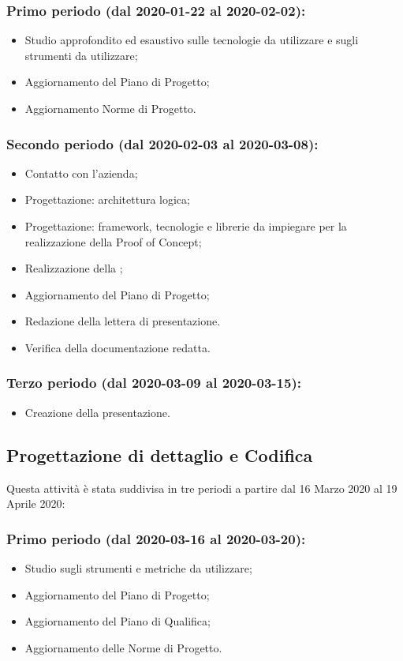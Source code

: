 		\subsubsection{Primo periodo (dal 2020-01-22 al 2020-02-02):}
			\begin{itemize}
			 	\item Studio approfondito ed esaustivo sulle tecnologie da utilizzare e sugli strumenti da utilizzare;
			 	\item Aggiornamento del Piano di Progetto;
			 	\item Aggiornamento Norme di Progetto.
			\end{itemize} 	
		
		\subsubsection{Secondo periodo (dal 2020-02-03 al 2020-03-08):}
			\begin{itemize}
				\item Contatto con l'azienda;
				\item Progettazione: architettura logica;
				\item Progettazione: framework, tecnologie e librerie da impiegare per la realizzazione della Proof of Concept;
				\item Realizzazione della ;
				\item Aggiornamento del Piano di Progetto;
				\item Redazione della lettera di presentazione.
				\item Verifica della documentazione redatta.
			\end{itemize}

		\subsubsection{Terzo periodo (dal 2020-03-09 al 2020-03-15):}
			\begin{itemize}
				\item Creazione della presentazione.
			\end{itemize}

	\subsection{Progettazione di dettaglio e Codifica}
	Questa attività è stata suddivisa in tre periodi a partire dal 16 Marzo 2020 al 19 Aprile 2020:


		\subsubsection{Primo periodo (dal 2020-03-16 al 2020-03-20):}
			\begin{itemize}
				\item Studio sugli strumenti e metriche da utilizzare;
			 	\item Aggiornamento del Piano di Progetto;
			 	\item Aggiornamento del Piano di Qualifica;
			 	\item Aggiornamento delle Norme di Progetto.
			\end{itemize} 	
		
